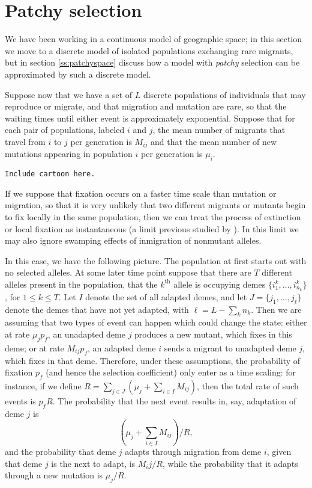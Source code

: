 \documentclass{article}
\begin{document}
{\section{Patchy selection} 
\label{ss:discretedemes}

We have been working in a continuous model of geographic space; 
in this section we move to a discrete model of isolated populations exchanging rare migrants,
but in section \ref{ss:patchyspace} discuss how a model with {\em patchy} selection can be approximated by such a discrete model.

Suppose now that we have a set of $L$ discrete populations of individuals that may reproduce or migrate,
and that migration and mutation are rare, so that the waiting times until either event is approximately exponential.
Suppose that for each pair of populations, labeled $i$ and $j$, the mean number of migrants that travel from $i$ to $j$ per generation
is $M_{ij}$ and that the mean number of new mutations appearing in population $i$ per generation is $\mu_i$.

{\tt Include cartoon here.}

If we suppose that fixation occurs on a faster time scale than mutation or migration,
so that it is very unlikely that two different migrants or mutants begin to fix locally in the same population,
then we can treat the process of extinction or local fixation as instantaneous 
(a limit previous studied by \cite{Slatkin:81}).
In this limit we may also ignore swamping effects of inmigration of nonmutant alleles.

In this case, we have the following picture.
The population at first starts out with no selected alleles. 
At some later time point suppose that there are $T$ different alleles present in the population, 
that the $k^\mathrm{th}$ allele is occupying demes $\{i^k_1, \ldots, i^k_{n_k}\}$, for $1\le k \le T$.
Let $I$ denote the set of all adapted demes, 
and let $J = \{j_1, \ldots, j_\ell\}$ denote the demes that have not yet adapted, with $\ell = L - \sum_k n_k$.
Then we are assuming that two types of event can happen which could change the state:
either at rate $\mu_j p_f$, an unadapted deme $j$ produces a new mutant, which fixes in this deme;
or at rate $M_{ij} p_f$, an adapted deme $i$ sends a migrant to unadapted deme $j$, which fixes in that deme.
Therefore, under these assumptions, the probability of fixation $p_f$ (and hence the selection coefficient)
only enter as a time scaling: for instance,
if we define $R = \sum_{j \in J} \left( \mu_j + \sum_{i \in I} M_{ij} \right)$,
then the total rate of such events is $p_f R$.
The probability that the next event results in, say, adaptation of deme $j$
is 
\[
 \left( \mu_j + \sum_{i \in I} M_{ij} \right) / R,
\]
and the probability that deme $j$ adapts through migration from deme $i$, given that deme $j$ is the next to adapt, is
$M_ij / R$,
while the probability that it adapts through a new mutation is $\mu_j / R$.

}
\end{document}
